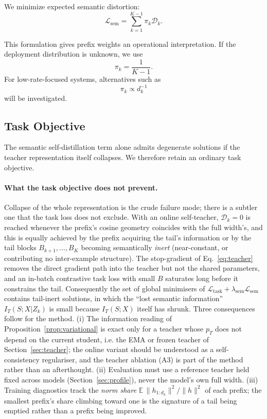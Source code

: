 \documentclass[11pt]{article}
\newcommand{\E}{\mathbb{E}}
\newcommand{\cL}{\mathcal{L}}
\newcommand{\cD}{\mathcal{D}}
\begin{document}
We minimize expected semantic distortion:
\begin{equation}
\boxed{
    \cL_{\mathrm{sem}}
    =
    \sum_{k=1}^{K-1}
    \pi_k \cD_k.
}
\label{eq:semantic-objective}
\end{equation}

This formulation gives prefix weights an operational interpretation.
If the deployment distribution is unknown, we use
\begin{equation}
    \pi_k=\frac{1}{K-1}.
\end{equation}
For low-rate-focused systems, alternatives such as
\begin{equation}
    \pi_k \propto d_k^{-1}
\end{equation}
will be investigated.


\subsection{Task Objective}
\label{sec:task}

The semantic self-distillation term alone admits degenerate solutions if the teacher representation itself collapses.
We therefore retain an ordinary task objective.

\paragraph{What the task objective does not prevent.}
Collapse of the whole representation is the crude failure mode; there is a subtler one that the task loss does not exclude.
With an online self-teacher, $\cD_k=0$ is reached whenever the prefix's cosine geometry coincides with the full width's, and this is equally achieved by the prefix acquiring the tail's information or by the tail blocks $B_{k+1},\ldots,B_K$ becoming semantically \emph{inert} (near-constant, or contributing no inter-example structure).
The stop-gradient of Eq.~\eqref{eq:teacher} removes the direct gradient path into the teacher but not the shared parameters, and an in-batch contrastive task loss with small $B$ saturates long before it constrains the tail.
Consequently the set of global minimisers of $\cL_{\mathrm{task}}+\lambda_{\mathrm{sem}}\cL_{\mathrm{sem}}$ contains tail-inert solutions, in which the ``lost semantic information'' $I_T(S;X|Z_k)$ is small because $I_T(S;X)$ itself has shrunk.
Three consequences follow for the method.
(i) The information reading of Proposition~\ref{prop:variational} is exact only for a teacher whose $p_T$ does not depend on the current student, i.e. the EMA or frozen teacher of Section~\ref{sec:teacher}; the online variant should be understood as a self-consistency regulariser, and the teacher ablation (A3) is part of the method rather than an afterthought.
(ii) Evaluation must use a reference teacher held fixed across models (Section~\ref{sec:profile}), never the model's own full width.
(iii) Training diagnostics track the \emph{norm share} $\E\,\|h_{1:d_k}\|^2/\|h\|^2$ of each prefix; the smallest prefix's share climbing toward one is the signature of a tail being emptied rather than a prefix being improved.
\end{document}
